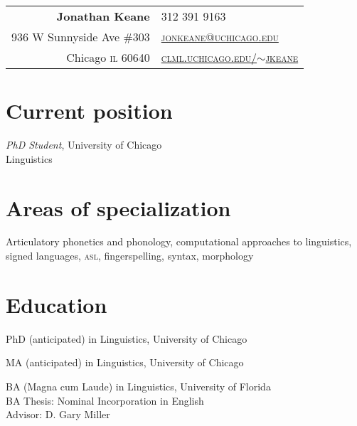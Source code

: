 \documentclass[10pt, letterpaper]{article}
\newcommand{\urltilde}{$\sim$}
\newcommand{\years}[1]{\marginpar{\scriptsize #1}}
\begin{document}
\thispagestyle{empty} %
\reversemarginpar
\raggedright

\begin{table}[!t]
  \begin{tabular*}{6.5in}{r|l}
    \hspace{3in}\textbf{\LARGE\sffamily Jonathan Keane}  &312 391 9163\\
   936 W Sunnyside Ave \#303 &  \href{mailto:jonkeane@uchicago.edu}{\textsc{jonkeane@uchicago.edu}}\\
    Chicago \textsc{il} 60640 & \href{http://clml.uchicago.edu/~jkeane}{\textsc{clml.uchicago.edu/\urltilde{}jkeane}}\\
  \end{tabular*}
\end{table}
\setlength\parindent{0in}
\setlength\parskip{0ex}
\section*{Current position}
\emph{PhD Student}, University of Chicago\\
Linguistics\\

\section*{Areas of specialization}
Articulatory phonetics and phonology, computational approaches to linguistics, signed languages, \textsc{asl}, fingerspelling, syntax, morphology


\section*{Education}
\-\years{2013}PhD (anticipated) in Linguistics, University of Chicago

\-\years{2011}\textsc{MA} (anticipated) in Linguistics, University of Chicago

\-\years{2007}\textsc{BA} (Magna cum Laude) in Linguistics, University of Florida\\
\hspace{2em}\textsc{BA} Thesis: Nominal Incorporation in English \\
\hspace{2em}Advisor: D. Gary Miller
\end{document}
